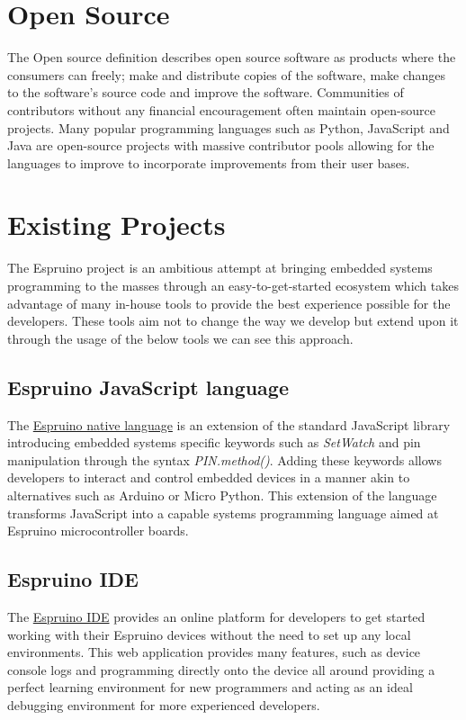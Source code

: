 \documentclass{l4proj}
\begin{document}
\section{Open Source}

The Open source definition \cite{perens1999open} describes open source software as products where the consumers can freely; make and distribute copies of the software, make changes to the software’s source code and improve the software. Communities of contributors without any financial encouragement often maintain open-source projects. Many popular programming languages such as Python, JavaScript and Java are open-source projects with massive contributor pools allowing for the languages to improve to incorporate improvements from their user bases.

\section{Existing Projects}
\text The Espruino project is an ambitious attempt at bringing embedded systems programming to the masses through an easy-to-get-started ecosystem which takes advantage of many in-house tools to provide the best experience possible for the developers. These tools aim not to change the way we develop but extend upon it through the usage of the below tools we can see this approach.

\subsection{Espruino JavaScript language}
The \href{https://www.espruino.com/Reference#top}{Espruino native language} is an extension of the standard JavaScript library introducing embedded systems specific keywords such as \textit{SetWatch} and pin manipulation through the syntax \textit{PIN.method()}. Adding these keywords allows developers to interact and control embedded devices in a manner akin to alternatives such as Arduino or Micro Python. This extension of the language transforms JavaScript into a capable systems programming language aimed at Espruino microcontroller boards.

\subsection{Espruino IDE}
The \href{https://www.espruino.com/ide/}{Espruino IDE} provides an online platform for developers to get started working with their Espruino devices without the need to set up any local environments. This web application provides many features, such as device console logs and programming directly onto the device all around providing a perfect learning environment for new programmers and acting as an ideal debugging environment for more experienced developers.
\end{document}

